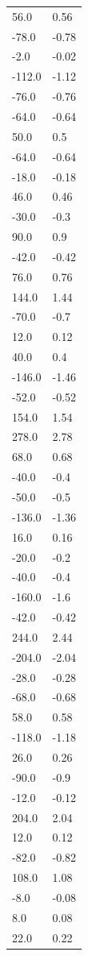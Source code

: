 \begin{longtable}{ll}
56.0 & 0.56 \\
-78.0 & -0.78 \\
-2.0 & -0.02 \\
-112.0 & -1.12 \\
-76.0 & -0.76 \\
-64.0 & -0.64 \\
50.0 & 0.5 \\
-64.0 & -0.64 \\
-18.0 & -0.18 \\
46.0 & 0.46 \\
-30.0 & -0.3 \\
90.0 & 0.9 \\
-42.0 & -0.42 \\
76.0 & 0.76 \\
144.0 & 1.44 \\
-70.0 & -0.7 \\
12.0 & 0.12 \\
40.0 & 0.4 \\
-146.0 & -1.46 \\
-52.0 & -0.52 \\
154.0 & 1.54 \\
278.0 & 2.78 \\
68.0 & 0.68 \\
-40.0 & -0.4 \\
-50.0 & -0.5 \\
-136.0 & -1.36 \\
16.0 & 0.16 \\
-20.0 & -0.2 \\
-40.0 & -0.4 \\
-160.0 & -1.6 \\
-42.0 & -0.42 \\
244.0 & 2.44 \\
-204.0 & -2.04 \\
-28.0 & -0.28 \\
-68.0 & -0.68 \\
58.0 & 0.58 \\
-118.0 & -1.18 \\
26.0 & 0.26 \\
-90.0 & -0.9 \\
-12.0 & -0.12 \\
204.0 & 2.04 \\
12.0 & 0.12 \\
-82.0 & -0.82 \\
108.0 & 1.08 \\
-8.0 & -0.08 \\
8.0 & 0.08 \\
22.0 & 0.22 \\

\end{longtable}
